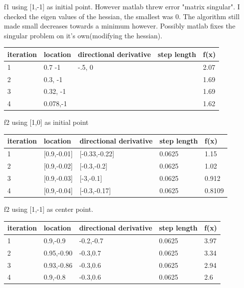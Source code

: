 \documentclass[7pt]{article}
\begin{document}
	
	f1 using [1,-1] as initial point. However matlab threw error "matrix singular". I checked the eigen values of the hessian, the smallest was 0. The algorithm still made small decreases towards a minimum however. Possibly matlab fixes the singular problem on it's own(modifying the hessian). 
		\begin{center}
			\begin{tabular}{ | l | l | l | l | l |}
				\hline
				iteration & location & directional derivative & step length & f(x) \\ \hline
				1& 0.7 -1  & -.5, 0  & & 2.07\\ \hline
				2&  0.3, -1 &  & & 1.69\\ \hline
				3& 0.32, -1 &  & & 1.69\\ \hline
				4& 0.078,-1 &  & & 1.62\\
				\hline
			\end{tabular}
		\end{center}
		
		
		
		f2 using [1,0] as initial point 
		\begin{center}
			\begin{tabular}{ | l | l | l | l | l |}
				\hline
				iteration & location & directional derivative & step length & f(x) \\ \hline
				1& [0.9,-0.01]  & [-0.33,-0.22] &  0.0625 & 1.15\\ \hline
				2& [0.9,-0.02] & [-0.3,-0.2] & 0.0625 & 1.02\\ \hline
				3& [0.9,-0.03] & [-3,-0.1]  & 0.0625 & 0.912\\ \hline
				4& [0.9,-0.04] & [-0.3,-0.17] & 0.0625 & 0.8109\\
				\hline
			\end{tabular}
		\end{center}
		
		
		f2 using [1,-1] as center point. 
			\begin{center}
				\begin{tabular}{ | l | l | l | l | l |}
					\hline
					iteration & location & directional derivative & step length & f(x) \\ \hline
					1& 0.9,-0.9 & -0.2,-0.7 & 0.0625 & 3.97\\ \hline
					2& 0.95,-0.90 & -0.3,0.7  & 0.0625 & 3.34\\ \hline
					3& 0.93,-0.86 & -0.3,0.6  & 0.0625 & 2.94\\ \hline
					4& 0.9,-0.8 & -0.3,0.6  & 0.0625 & 2.6\\
					\hline
				\end{tabular}
			\end{center}
		
\end{document}
